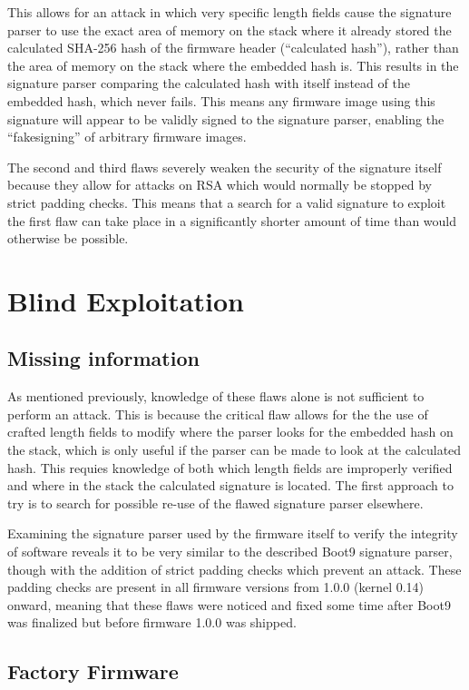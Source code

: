 \documentclass[journal]{IEEEtran}
\begin{document}
This allows for an attack in which very specific length fields cause the
signature parser to use the exact area of memory on the stack where it already
stored the calculated SHA-256 hash of the firmware header (``calculated hash''),
rather than the area of memory on the stack where the embedded hash is. This
results in the signature parser comparing the calculated hash with itself
instead of the embedded hash, which never fails. This means any firmware image
using this signature will appear to be validly signed to the signature parser,
enabling the ``fakesigning'' of arbitrary firmware images.

The second and third flaws severely weaken the security of the signature itself
because they allow for attacks on RSA which would normally be stopped by strict
padding checks. This means that a search for a valid signature to exploit the
first flaw can take place in a significantly shorter amount of time than would
otherwise be possible.

\section{Blind Exploitation}

\subsection{Missing information}

As mentioned previously, knowledge of these flaws alone is not sufficient to
perform an attack. This is because the critical flaw allows for the the use of
crafted length fields to modify where the parser looks for the embedded hash on
the stack, which is only useful if the parser can be made to look at the
calculated hash. This requies knowledge of both which length fields are
improperly verified and where in the stack the calculated signature is located.
The first approach to try is to search for possible re-use of the flawed
signature parser elsewhere.

Examining the signature parser used by the firmware itself to verify the
integrity of software reveals it to be very similar to the described Boot9
signature parser, though with the addition of strict padding checks which
prevent an attack. These padding checks are present in all firmware versions
from 1.0.0 (kernel 0.14) onward, meaning that these flaws were noticed and fixed
some time after Boot9 was finalized but before firmware 1.0.0 was shipped.

\subsection{Factory Firmware}
\end{document}
